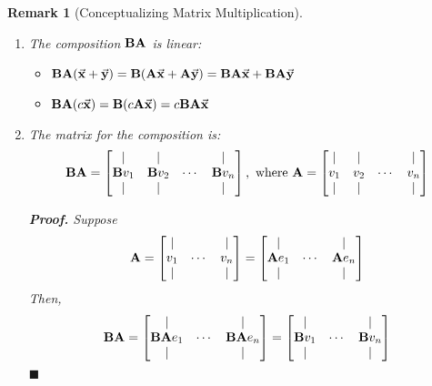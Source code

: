\documentclass[12pt, a4paper]{article}
\newtheorem{eg}{Example}[subsection]
\newtheorem*{rmk}{\indent Remark}
\newenvironment*{prf}{\par\indent\textbf{\textit{Proof. }}}{\hfill $\blacksquare$\par}
\def\vecx{\va{x}}
\def\vecy{\va{y}}
\def\matrixA{\vb{A}}
\def\matrixB{\vb{B}}
\begin{document}
\begin{rmk}[Conceptualizing Matrix Multiplication]
\begin{enumerate}
\begin{eg}
	\end{eg}
	\item The composition $\matrixB\matrixA$ is linear: 
	\begin{itemize}
		\item $\matrixB\matrixA(\vecx+\vecy)=\matrixB(\matrixA\vecx+\matrixA\vecy)=\matrixB\matrixA\vecx+\matrixB\matrixA\vecy$
		\item $\matrixB\matrixA(c\vecx)=\matrixB(c\matrixA\vecx)=c\matrixB\matrixA\vecx$
	\end{itemize}
	\item The matrix for the composition is: 
	\[\matrixB\matrixA=\begin{bmatrix}|&|&&|\\\matrixB v_1&\matrixB v_2&\cdots&\matrixB v_n\\|&|&&|\end{bmatrix},\text{ where }\matrixA=\begin{bmatrix}|&|&&|\\v_1&v_2&\cdots&v_n\\|&|&&|\end{bmatrix}\]
	\begin{prf}
		Suppose \[\matrixA=\begin{bmatrix}|&&|\\v_1&\cdots&v_n\\|&&|\end{bmatrix}=\begin{bmatrix}|&&|\\\matrixA e_1&\cdots&\matrixA e_n\\|&&|\end{bmatrix}\]
		Then, \[\matrixB\matrixA=\begin{bmatrix}|&&|\\\matrixB\matrixA e_1&\cdots &\matrixB\matrixA e_n\\|&&|\end{bmatrix}=\begin{bmatrix}|&&|\\\matrixB v_1&\cdots &\matrixB v_n\\|&&|\end{bmatrix}\]	
	\end{prf}
\end{enumerate}	
\end{rmk}
\end{document}
